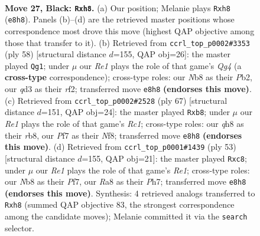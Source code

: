 \documentclass[11pt]{article}
\begin{document}
\clearpage

\begin{figure}[p]\centering
\begin{subfigure}{0.46\textwidth}\centering
\resizebox{\linewidth}{!}{%
\newchessgame
\chessboard[
  setfen={rn2r2Q/pR1n1pk1/3p4/q2P2b1/4P1P1/2NQ4/4N3/4K2R b K - 0 27},
  showmover=false,
  pgfstyle=straightmove, color=movearrow, markmove={e8-h8}
]}
\caption{}
\end{subfigure}\hfill
\begin{subfigure}{0.46\textwidth}\centering
\resizebox{\linewidth}{!}{%
\newchessgame
\chessboard[
  setfen={2bq2k1/6np/1p1p2p1/3Pp2n/6QN/P1NBP3/1P3r2/K6R w - - 4 30},
  showmover=false,
  pgfstyle=straightmove, color=movearrow, markmove={g4-g1}
]}
\caption{}
\end{subfigure}
\\[4pt]
\begin{subfigure}{0.46\textwidth}\centering
\resizebox{\linewidth}{!}{%
\newchessgame
\chessboard[
  setfen={1Rr2nk1/7p/3p1b2/8/3Pp1p1/3qB1P1/4NP2/4RQK1 b - - 0 34},
  showmover=false,
  pgfstyle=straightmove, color=movearrow, markmove={c8-b8}
]}
\caption{}
\end{subfigure}\hfill
\begin{subfigure}{0.46\textwidth}\centering
\resizebox{\linewidth}{!}{%
\newchessgame
\chessboard[
  setfen={2R1r1k1/p4ppp/n7/1q2P3/1p1p3P/P2N2P1/4QP2/3R2K1 b - - 0 27},
  showmover=false,
  pgfstyle=straightmove, color=movearrow, markmove={e8-c8}
]}
\caption{}
\end{subfigure}
\caption{\textbf{Move 27, Black: \texttt{Rxh8}.} (a) Our position; Melanie plays \texttt{Rxh8} (\texttt{e8h8}). Panels (b)--(d) are the retrieved master positions whose correspondence most drove this move (highest QAP objective among those that transfer to it). (b) Retrieved from \texttt{ccrl\_top\_p0002\#3353} (ply 58) [structural distance $d$=155, QAP obj=26]: the master played \texttt{Qg1}; under $\mu$ our \emph{Re1} plays the role of that game's \emph{Qg4} (a \textbf{cross-type} correspondence); cross-type roles: our \emph{N}b8 as their \emph{P}b2, our \emph{q}d3 as their \emph{r}f2; transferred move \texttt{e8h8} \textbf{(endorses this move)}. (c) Retrieved from \texttt{ccrl\_top\_p0002\#2528} (ply 67) [structural distance $d$=151, QAP obj=24]: the master played \texttt{Rxb8}; under $\mu$ our \emph{Re1} plays the role of that game's \emph{Rc1}; cross-type roles: our \emph{q}h8 as their \emph{r}b8, our \emph{P}f7 as their \emph{N}f8; transferred move \texttt{e8h8} \textbf{(endorses this move)}. (d) Retrieved from \texttt{ccrl\_top\_p0001\#1439} (ply 53) [structural distance $d$=155, QAP obj=21]: the master played \texttt{Rxc8}; under $\mu$ our \emph{Re1} plays the role of that game's \emph{Re1}; cross-type roles: our \emph{N}b8 as their \emph{P}f7, our \emph{R}a8 as their \emph{P}h7; transferred move \texttt{e8h8} \textbf{(endorses this move)}. Synthesis: 4 retrieved analogs transferred to \texttt{Rxh8} (summed QAP objective 83, the strongest correspondence among the candidate moves); Melanie committed it via the \texttt{search} selector.}
\label{fig:thought-m53}
\end{figure}
\end{document}
